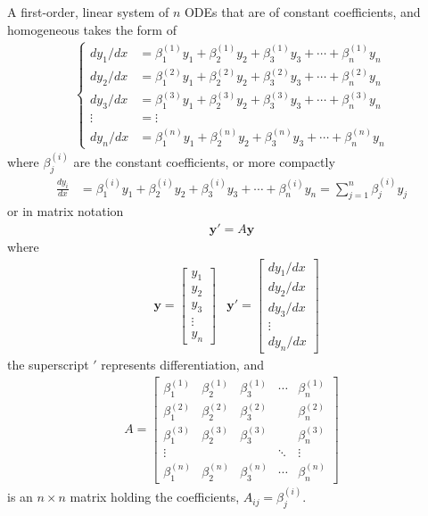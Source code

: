 \begin{defn}
A first-order, linear system of $n$ ODEs that are of constant coefficients, and homogeneous takes the form of
\begin{align*}
\begin{cases}
dy_1/dx &= \beta_1^{(1)} y_1 + \beta_2^{(1)} y_2 + \beta_3^{(1)} y_3 + \cdots + \beta_n^{(1)} y_n \\
dy_2/dx &= \beta_1^{(2)} y_1 + \beta_2^{(2)} y_2 + \beta_3^{(2)} y_3 + \cdots + \beta_n^{(2)} y_n \\
dy_3/dx &= \beta_1^{(3)} y_1 + \beta_2^{(3)} y_2 + \beta_3^{(3)} y_3 + \cdots + \beta_n^{(3)} y_n \\
\vdots &= \vdots \\
dy_n/dx &= \beta_1^{(n)} y_1 + \beta_2^{(n)} y_2 + \beta_3^{(n)} y_3 + \cdots + \beta_n^{(n)} y_n
\end{cases}
\end{align*}
where $\beta_j^{(i)}$ are the constant coefficients, or more compactly
\begin{align*}
\frac{dy_i}{dx} &= \beta_1^{(i)} y_1 + \beta_2^{(i)} y_2 + \beta_3^{(i)} y_3 + \cdots + \beta_n^{(i)} y_n = \sum_{j=1}^{n} \beta_j^{(i)} y_j
\end{align*}
or in matrix notation
\begin{align*}
\textbf{y}' = A\textbf{y}
\end{align*}
where
\begin{align*}
&\textbf{y} =
\begin{bmatrix}
y_1 \\
y_2 \\
y_3 \\
\vdots \\
y_n
\end{bmatrix}
&\textbf{y}' =
\begin{bmatrix}
dy_1/dx \\
dy_2/dx \\
dy_3/dx \\
\vdots \\
dy_n/dx
\end{bmatrix}
\end{align*}
the superscript $'$ represents differentiation, and
\begin{align*}
A =
\begin{bmatrix}
\beta_1^{(1)} & \beta_2^{(1)} & \beta_3^{(1)} & \cdots & \beta_n^{(1)} \\
\beta_1^{(2)} & \beta_2^{(2)} & \beta_3^{(2)} & & \beta_n^{(2)} \\
\beta_1^{(3)} & \beta_2^{(3)} & \beta_3^{(3)} & & \beta_n^{(3)} \\
\vdots & & & \ddots & \vdots \\
\beta_1^{(n)} & \beta_2^{(n)} & \beta_3^{(n)} & \cdots & \beta_n^{(n)}
\end{bmatrix}
\end{align*}
is an $n \times n$ matrix holding the coefficients, $A_{ij} = \beta_j^{(i)}$.
\end{defn}
